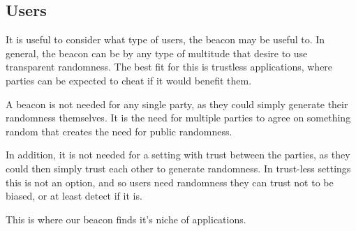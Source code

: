 \subsection{Users}
It is useful to consider what type of users, the beacon may be useful to. In general, the beacon can be by any type of multitude that desire to use transparent randomness. The best fit for this is trustless applications, where parties can be expected to cheat if it would benefit them.

A beacon is not needed for any single party, as they could simply generate their randomness themselves. It is the need for multiple parties to agree on something random that creates the need for public randomness.

In addition, it is not needed for a setting with trust between the parties, as they could then simply trust each other to generate randomness. In trust-less settings this is not an option, and so users need randomness they can trust not to be biased, or at least detect if it is.

This is where our beacon finds it's niche of applications.